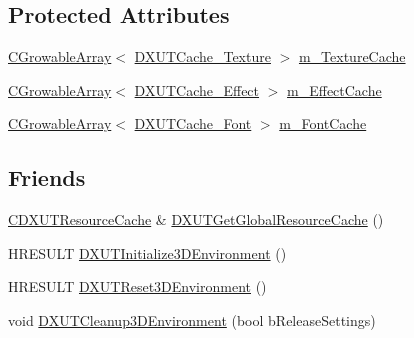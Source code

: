 \subsection*{Protected Attributes}
\begin{DoxyCompactItemize}
\item 
\hyperlink{class_c_growable_array}{CGrowableArray}$<$ \hyperlink{struct_d_x_u_t_cache___texture}{DXUTCache\_\-Texture} $>$ \hyperlink{class_c_d_x_u_t_resource_cache_a78a0625d24096363227bf95d51f129ad}{m\_\-TextureCache}
\item 
\hyperlink{class_c_growable_array}{CGrowableArray}$<$ \hyperlink{struct_d_x_u_t_cache___effect}{DXUTCache\_\-Effect} $>$ \hyperlink{class_c_d_x_u_t_resource_cache_a8dedf93e482bd77018709733a6c664c0}{m\_\-EffectCache}
\item 
\hyperlink{class_c_growable_array}{CGrowableArray}$<$ \hyperlink{struct_d_x_u_t_cache___font}{DXUTCache\_\-Font} $>$ \hyperlink{class_c_d_x_u_t_resource_cache_a014f0621996d9fdb9ad32630ba1d9afa}{m\_\-FontCache}
\end{DoxyCompactItemize}
\subsection*{Friends}
\begin{DoxyCompactItemize}
\item 
\hyperlink{class_c_d_x_u_t_resource_cache}{CDXUTResourceCache} \& \hyperlink{class_c_d_x_u_t_resource_cache_aa4ef62fbd7e1e944b3aea0f090f3de5f}{DXUTGetGlobalResourceCache} ()
\item 
HRESULT \hyperlink{class_c_d_x_u_t_resource_cache_a3b09c83d5019bcc724c80b297c581f90}{DXUTInitialize3DEnvironment} ()
\item 
HRESULT \hyperlink{class_c_d_x_u_t_resource_cache_ad0f752da1fdf43f04bf43f8210d6e5f0}{DXUTReset3DEnvironment} ()
\item 
void \hyperlink{class_c_d_x_u_t_resource_cache_af3c5bc0824d1e05bc4c3a5190896a259}{DXUTCleanup3DEnvironment} (bool bReleaseSettings)
\end{DoxyCompactItemize}


